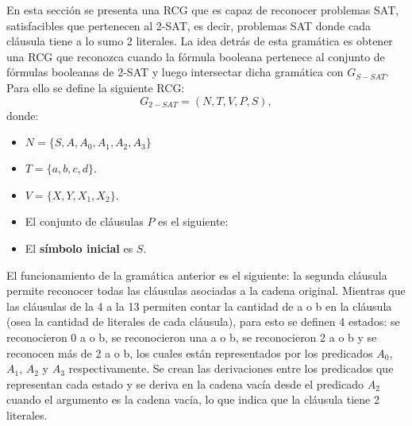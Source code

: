\documentclass[12pt]{article}
\begin{document}
En esta sección se presenta una RCG que es capaz de reconocer problemas SAT, satisfacibles que pertenecen
al 2-SAT, es decir, problemas SAT donde cada cláusula tiene a lo sumo 2 literales. La idea detrás de esta
gramática es obtener una RCG que reconozca cuando la fórmula booleana pertenece al conjunto
de fórmulas booleanas de 2-SAT y luego intersectar dicha gramática con $G_{S-SAT}$.  Para ello se define la siguiente RCG:
\[
    G_{2-SAT} = (N, T, V, P, S),
\]
donde:

\begin{itemize}
    \item $N=\{S,A,A_0,A_1,A_2,A_3\}$
    \item $T=\{a,b,c,d\}$.
    \item $V=\{X,Y,X_1,X_2\}$.
    \item El conjunto de cláusulas $P$ es el siguiente:
          \begin{enumerate}
          \end{enumerate}
    \item El \textbf{símbolo inicial} es $S$.
\end{itemize}

El funcionamiento de la gramática anterior es el siguiente: la segunda cláusula permite reconocer todas las
cláusulas asociadas a la cadena original. Mientras que las cláusulas de la 4 a la 13 permiten contar
la cantidad de a o b en la cláusula (osea la cantidad de literales de cada cláusula), para esto se definen
4 estados: se reconocieron 0 a o b, se reconocieron una a o b, se reconocieron 2 a o b y se reconocen
más de 2 a o b, los cuales están representados por los predicados $A_0$, $A_1$, $A_2$ y $A_3$ respectivamente.
Se crean las derivaciones entre los predicados que representan cada estado y se deriva en la cadena vacía
desde el predicado $A_2$ cuando el argumento es la cadena vacía, lo que indica que la cláusula tiene 2 literales.
\end{document}
